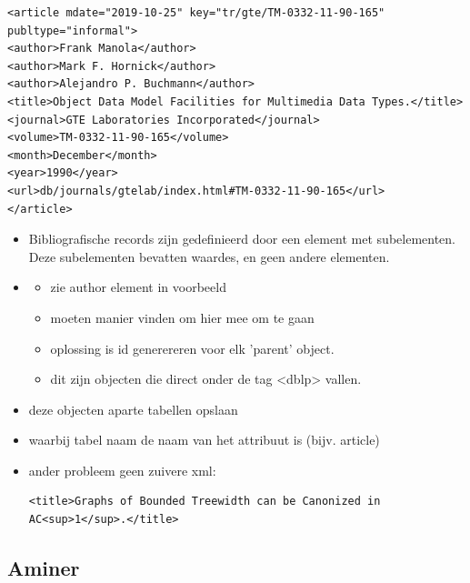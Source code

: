 \documentclass{ou-report}
\begin{document}
\lstset{language=XML}
\begin{lstlisting}[caption={DBLP bibliografic record example},label={lst:DblpExample}]
<article mdate="2019-10-25" key="tr/gte/TM-0332-11-90-165" publtype="informal">
<author>Frank Manola</author>
<author>Mark F. Hornick</author>
<author>Alejandro P. Buchmann</author>
<title>Object Data Model Facilities for Multimedia Data Types.</title>
<journal>GTE Laboratories Incorporated</journal>
<volume>TM-0332-11-90-165</volume>
<month>December</month>
<year>1990</year>
<url>db/journals/gtelab/index.html#TM-0332-11-90-165</url>
</article>
\end{lstlisting}
\begin{itemize}
    \item Bibliografische records zijn gedefinieerd door een element met subelementen. Deze subelementen bevatten waardes, en geen andere elementen.
    
    \item 
    \begin{itemize}
        \item zie author element in voorbeeld
        \item moeten manier vinden om hier mee om te gaan
        \item oplossing is id generereren voor elk 'parent' object.
        \item dit zijn objecten die direct onder de tag <dblp> vallen.
    \end{itemize}
   
    
    
    \item deze objecten aparte tabellen opslaan
    \item waarbij tabel naam de naam van het attribuut is (bijv. article)
     \item ander probleem geen zuivere xml: 
    \lstset{language=XML}
    \begin{lstlisting}[caption={XML fout},label={lst:DblpExample2}]
    <title>Graphs of Bounded Treewidth can be Canonized in AC<sup>1</sup>.</title>
    \end{lstlisting}
    
\end{itemize}

\subsection{Aminer}
\end{document}
